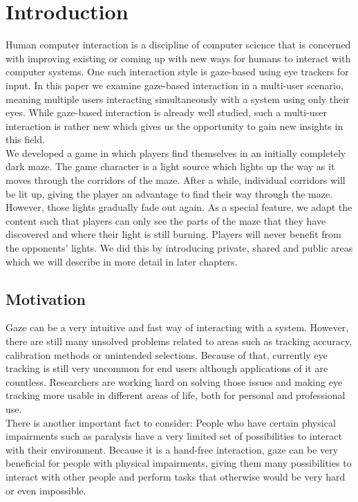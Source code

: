 \documentclass{sigchi}
\begin{document}
\section{Introduction}
Human computer interaction is a discipline of computer science that is concerned with improving existing or coming up with new ways for humans to interact with computer systems. One such interaction style is gaze-based using eye trackers for input. In this paper we examine gaze-based interaction in a multi-user scenario, meaning multiple users interacting simultaneously with a system using only their eyes. While gaze-based interaction is already well studied, such a multi-user interaction is rather new which gives us the opportunity to gain new insights in this field.\\
We developed a game in which players find themselves in an initially completely dark maze. The game character is a light source which lights up the way as it moves through the corridors of the maze. After a while, individual corridors will be lit up, giving the player an advantage to find their way through the maze. However, those lights gradually fade out again. As a special feature, we adapt the content such that players can only see the parts of the maze that they have discovered and where their light is still burning. Players will never benefit from the opponents' lights. We did this by introducing private, shared and public areas which we will describe in more detail in later chapters.

\subsection{Motivation}
Gaze can be a very intuitive and fast way of interacting with a system. However, there are still many unsolved problems related to areas such as tracking accuracy, calibration methods or unintended selections. Because of that, currently eye tracking is still very uncommon for end users although applications of it are countless. Researchers are working hard on solving those issues and making eye tracking more usable in different areas of life, both for personal and professional use.\\
There is another important fact to consider: People who have certain physical impairments such as paralysis have a very limited set of possibilities to interact with their environment. Because it is a hand-free interaction, gaze can be very beneficial for people with physical impairments, giving them many possibilities to interact with other people and perform tasks that otherwise would be very hard or even impossible.
\end{document}
